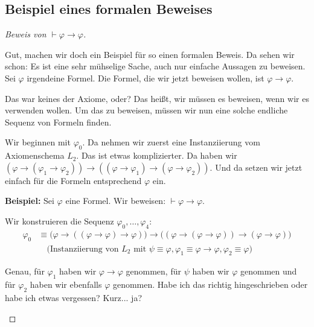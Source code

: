 \subsection{Beispiel eines formalen Beweises}

\begin{proof}[Beweis von $\vdash \varphi \to \varphi$]
\begin{spoken-clean}[00:32:47 - 00:34:50]
Gut, machen wir doch ein Beispiel für so einen formalen Beweis. Da sehen wir schon: Es ist eine sehr mühselige Sache, auch nur einfache Aussagen zu beweisen. Sei $\varphi$ irgendeine Formel. Die Formel, die wir jetzt beweisen wollen, ist $\varphi \to \varphi$.

Das war keines der Axiome, oder? Das heißt, wir müssen es beweisen, wenn wir es verwenden wollen. Um das zu beweisen, müssen wir nun eine solche endliche Sequenz von Formeln finden.

Wir beginnen mit $\varphi_0$. Da nehmen wir zuerst eine Instanziierung vom Axiomenschema $L_2$. Das ist etwas komplizierter. Da haben wir $(\varphi \to (\varphi_1 \to \varphi_2)) \to ((\varphi \to \varphi_1) \to (\varphi \to \varphi_2))$. Und da setzen wir jetzt einfach für die Formeln entsprechend $\varphi$ ein.
\end{spoken-clean}

\begin{math-stroke}
\textbf{Beispiel:} Sei $\varphi$ eine Formel. Wir beweisen: $\vdash \varphi \to \varphi$.

Wir konstruieren die Sequenz $\varphi_0, \dots, \varphi_4$:
\begin{align*}
    \varphi_0 &\equiv \bigl(\varphi \to ((\varphi \to \varphi) \to \varphi)\bigr) \to \bigl((\varphi \to (\varphi \to \varphi)) \to (\varphi \to \varphi)\bigr) \\
    &\quad \text{(Instanziierung von } L_2 \text{ mit } \psi \equiv \varphi, \varphi_1 \equiv \varphi \to \varphi, \varphi_2 \equiv \varphi\text{)}
\end{align*}
\end{math-stroke}

\begin{spoken-clean}[00:34:50 - 00:36:57]
Genau, für $\varphi_1$ haben wir $\varphi \to \varphi$ genommen, für $\psi$ haben wir $\varphi$ genommen und für $\varphi_2$ haben wir ebenfalls $\varphi$ genommen. Habe ich das richtig hingeschrieben oder habe ich etwas vergessen? Kurz... ja? 
\end{spoken-clean}


\end{proof}

